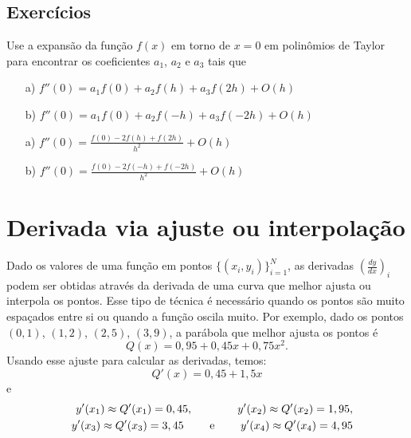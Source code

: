 \subsection*{Exercícios}

\begin{Exercise} Use a expansão da função $f(x)$ em torno de $x=0$ em polinômios de Taylor para encontrar os coeficientes $a_1$, $a_2$ e $a_3$ tais que
\begin{itemize}
\item[a)] $f''(0)=a_1f(0)+a_2f(h)+a_3f(2h) + O(h)$
\item[b)] $f''(0)=a_1f(0)+a_2f(-h)+a_3f(-2h) + O(h)$
\end{itemize}
\end{Exercise}
\begin{Answer}
  \begin{tiny}
\begin{itemize}
\item[a)] $f''(0)=\frac{f(0)-2f(h)+f(2h)}{h^2}+O(h)$
\item[b)] $f''(0)=\frac{f(0)-2f(-h)+f(-2h)}{h^2}+O(h)$
\end{itemize}    
  \end{tiny}
\end{Answer}

\section{Derivada via ajuste ou interpolação}

Dado os valores de uma função em pontos $\{(x_i,y_i)\}_{i=1}^N$, as derivadas $\left(\frac{dy}{dx}\right)_i$ podem ser obtidas através da derivada de uma curva que melhor ajusta ou interpola os pontos. Esse tipo de técnica é necessário quando os pontos são muito espaçados entre si ou quando a função oscila muito. Por exemplo, dado os pontos $(0,1)$, $(1,2)$, $(2,5)$, $(3,9)$, a parábola que melhor ajusta os pontos é
$$
Q(x)=0,95 + 0,45x + 0,75x^2.
$$
Usando esse ajuste para calcular as derivadas, temos:
$$
Q'(x)=0,45 + 1,5x
$$
e
\begin{eqnarray*}
&&y'(x_1)\approx Q'(x_1)=0,45, \qquad\qquad y'(x_2)\approx Q'(x_2)=1,95, \\&& y'(x_3)\approx Q'(x_3)=3,45 \qquad ~ \hbox{e} ~ \qquad y'(x_4)\approx Q'(x_4)=4,95
\end{eqnarray*}

